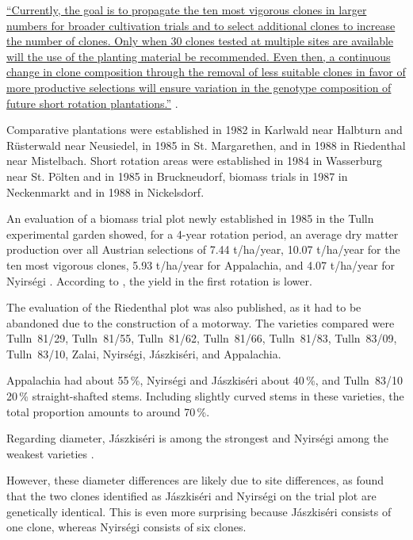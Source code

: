 \hyperlink{german:mueller1999robinie}{\enquote{Currently, the goal is to propagate the ten most vigorous clones in larger numbers
for broader cultivation trials and to select additional clones to increase the number
of clones. Only when 30 clones tested at multiple sites are available will the use
of the planting material be recommended. Even then, a continuous change in clone composition
through the removal of less suitable clones in favor of more productive selections
will ensure variation in the genotype composition of future short rotation plantations.}}
\citep[own translation]{mueller1999robinie}.

Comparative plantations were established in 1982 in Karlwald near Halbturn and Rüsterwald
near Neusiedel, in 1985 in St. Margarethen, and in 1988 in Riedenthal near Mistelbach.
Short rotation areas were established in 1984 in Wasserburg near St. Pölten and in 1985 in Bruckneudorf,
biomass trials in 1987 in Neckenmarkt and in 1988 in Nickelsdorf.

An evaluation of a biomass trial plot newly established in 1985 in the Tulln experimental garden
showed, for a 4-year rotation period, an average dry matter production over all Austrian selections
of 7.44 t/ha/year, 10.07 t/ha/year for the ten most vigorous clones, 5.93 t/ha/year for Appalachia,
and 4.07 t/ha/year for Nyirségi \citep{mueller1991robinie}. According to \citet{redei2005robinieEnergieholz},
the yield in the first rotation is lower.

The evaluation of the Riedenthal plot was also published, as it had to be abandoned due to
the construction of a motorway. The varieties compared were Tulln~81/29, Tulln~81/55,
Tulln~81/62, Tulln~81/66, Tulln~81/83, Tulln~83/09, Tulln~83/10, Zalai, Nyirségi, Jászkiséri,
and Appalachia.

Appalachia had about 55\,\%, Nyirségi and Jászkiséri about 40\,\%, and Tulln~83/10 20\,\%
straight-shafted stems. Including slightly curved stems in these varieties, the total proportion
amounts to around 70\,\%.

Regarding diameter, Jászkiséri is among the strongest and Nyirségi among the weakest varieties \citep{schueler2006robinie}.

However, these diameter differences are likely due to site differences, as \citet{heinze2014robinie}
found that the two clones identified as Jászkiséri and Nyirségi on the trial plot are genetically identical.
This is even more surprising because Jászkiséri consists of one clone, whereas Nyirségi consists of six clones.

